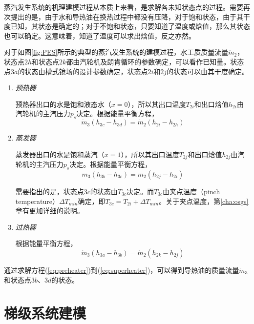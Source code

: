蒸汽发生系统的机理建模过程从本质上来看，是求解各未知状态点的过程。需要再次提出的是，由于水和导热油在换热过程中都没有压降，对于饱和状态，由于其干度已知，其状态是确定的；对于不饱和状态，只要知道了温度或焓值，那么其状态也可以确定。这意味着，知道了温度可以求出焓值，反之亦然。

对于如图\ref{fig:PES}所示的典型的蒸汽发生系统的建模过程，水工质质量流量$\dot{m}_2$，状态点$2h$和状态点$2k$都由汽轮机及朗肯循环的参数确定，可以看作已知量。状态点$3a$的状态由槽式镜场的设计参数确定，状态点$2i$和$2j$的状态可以由其干度确定。

\begin{enumerate}[label=(\arabic*)]
  \item \emph{预热器}
  
\setlength\parindent{2em}预热器出口的水是饱和液态水（$x = 0$），所以其出口温度$T_{2i}$和出口焓值$h_{2i}$由汽轮机的主汽压力$p_s$决定。根据能量平衡方程，
  \begin{equation}
  \dot{m}_3 (h_{3c}-h_{3d})=\dot{m}_2 (h_{2i} - h_{2h})
  \label{eq:preheater}
\end{equation}

  \item \emph{蒸发器}
  
  蒸发器出口的水是饱和蒸汽（$x = 1$），所以其出口温度$T_{2j}$和出口焓值$h_{2j}$由汽轮机的主汽压力$p_s$决定。根据能量平衡方程，
  \begin{equation}
  \dot{m}_3 (h_{3b}-h_{3c})=\dot{m}_2 (h_{2j} - h_{2i})
  \label{eq:evaporator}
\end{equation}

	需要指出的是，状态点$3c$的状态由$T_{3c}$决定。而$T_{3c}$由夹点温度（pinch temperature）$\Delta T_{min}$确定，即$T_{3c} = T_{2i} + \Delta T_{min}$。关于夹点温度，第\ref{cha:osgs}章有更加详细的说明。
  
  \item \emph{过热器}
  
  根据能量平衡方程，
  \begin{equation}
  \dot{m}_3 (h_{3a}-h_{3b})=\dot{m}_2 (h_{2k} - h_{2j})
  \label{eq:superheater}
\end{equation}

\end{enumerate}

通过求解方程(\ref{eq:preheater})到(\ref{eq:superheater})，可以得到导热油的质量流量$\dot{m}_3$和状态点$3b$、$3d$的状态。

\section{梯级系统建模}

